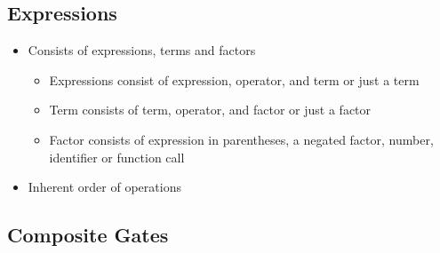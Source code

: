 \subsection{Expressions}
\begin{itemize}
    \item Consists of expressions, terms and factors
    \begin{itemize}
        \item Expressions consist of expression, operator, and term or just a term
        \item Term consists of term, operator, and factor or just a factor
        \item Factor consists of expression in parentheses, a negated factor, number, identifier or function call
    \end{itemize}
    \item Inherent order of operations
\end{itemize}

\subsection{Composite Gates}